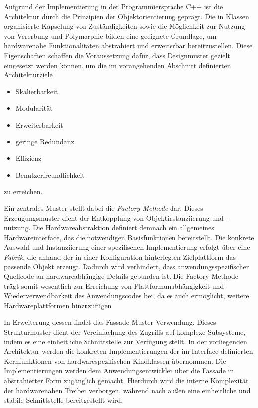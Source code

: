 Aufgrund der Implementierung in der Programmiersprache C++ ist die Architektur durch die Prinzipien der Objektorientierung geprägt. 
Die in Klassen organisierte Kapselung von Zuständigkeiten sowie die Möglichkeit zur Nutzung von Vererbung und Polymorphie bilden eine geeignete Grundlage, um hardwarenahe Funktionalitäten abstrahiert und erweiterbar bereitzustellen. 
Diese Eigenschaften schaffen die Voraussetzung dafür, dass Designmuster gezielt eingesetzt werden können, um die im vorangehenden Abschnitt definierten Architekturziele
\begin{itemize}
	\item Skalierbarkeit
	\item Modularität
	\item Erweiterbarkeit
	\item geringe Redundanz
	\item Effizienz
	\item Benutzerfreundlichkeit
\end{itemize}
 zu erreichen.

Ein zentrales Muster stellt dabei die \textit{Factory-Methode} dar.
Dieses Erzeugungsmuster dient der Entkopplung von Objektinstanziierung und -nutzung.
Die Hardwareabstraktion definiert demnach ein allgemeines Hardwareinterface, das die notwendigen Basisfunktionen bereitstellt.
Die konkrete Auswahl und Instanziierung einer spezifischen Implementierung erfolgt über eine \textit{Fabrik}, die anhand der in einer Konfiguration hinterlegten Zielplattform das passende Objekt erzeugt.
Dadurch wird verhindert, dass anwendungsspezifischer Quellcode an hardwareabhängige Details gebunden ist.
Die Factory-Methode trägt somit wesentlich zur Erreichung von Plattformunabhängigkeit und Wiederverwendbarkeit des Anwendungscodes bei, da es auch ermöglicht, weitere Hardwareplattformen hinzuzufügen

In Erweiterung dessen findet das Fassade-Muster Verwendung. 
Dieses Strukturmuster dient der Vereinfachung des Zugriffs auf komplexe Subsysteme, indem es eine einheitliche Schnittstelle zur Verfügung stellt. 
In der vorliegenden Architektur werden die konkreten Implementierungen der im Interface definierten Kernfunktionen von hardwarespezifischen Kindklassen übernommen. 
Die Implementierungen werden dem Anwendungsentwickler über die Fassade in abstrahierter Form zugänglich gemacht. 
Hierdurch wird die interne Komplexität der hardwarenahen Treiber verborgen, während nach außen eine einheitliche und stabile Schnittstelle bereitgestellt wird.

